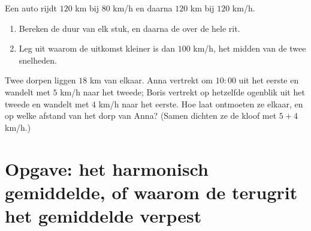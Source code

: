 \begin{exercise}[$\star\star$]\label{exo:g8:speed:10}
Een auto rijdt $120$ km bij $80$ km/h en daarna $120$ km bij $120$ km/h.
\begin{enumerate}
  \item Bereken de duur van elk stuk, en daarna de  over de
        hele rit.
  \item Leg uit waarom de uitkomst kleiner is dan $100$ km/h, het midden van de
        twee snelheden.
\end{enumerate}
\end{exercise}

\begin{exercise}[$\star\star\star$]\label{exo:g8:speed:11}
Twee dorpen liggen $18$ km van elkaar. Anna vertrekt om $10{:}00$ uit het eerste
en wandelt met $5$ km/h naar het tweede; Boris vertrekt op hetzelfde ogenblik uit
het tweede en wandelt met $4$ km/h naar het eerste. Hoe laat ontmoeten ze elkaar,
en op welke afstand van het dorp van Anna? (Samen dichten ze de kloof met
$5 + 4$ km/h.)
\end{exercise}

\section{Opgave: het harmonisch gemiddelde, of waarom de terugrit het gemiddelde
verpest}

